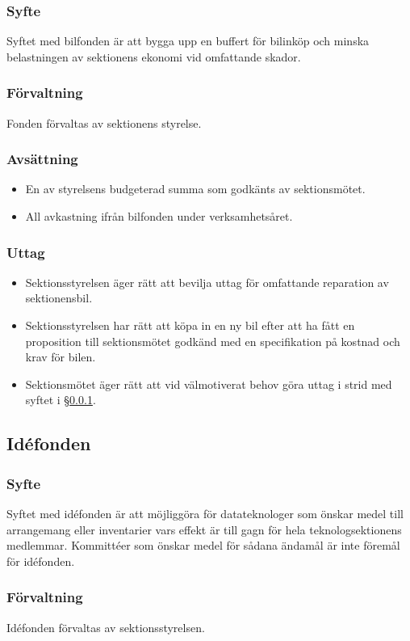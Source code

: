 \documentclass[a4paper, 10pt]{article}
\begin{document}
\subsubsection{Syfte}
\label{sec:bilfond_syfte}
Syftet med bilfonden är att bygga upp en buffert för bilinköp och minska belastningen av sektionens ekonomi vid omfattande skador.
\subsubsection{Förvaltning}
Fonden förvaltas av sektionens styrelse.
\subsubsection{Avsättning}
\begin{itemize}
\item En av styrelsens budgeterad summa som godkänts av sektionsmötet.
\item All avkastning ifrån bilfonden under verksamhetsåret.
\end{itemize}
\subsubsection{Uttag}
\begin{itemize}
    \item Sektionsstyrelsen äger rätt att bevilja uttag för omfattande reparation av sektionensbil.
    \item Sektionsstyrelsen har rätt att köpa in en ny bil efter att ha fått en proposition till sektionsmötet godkänd med en specifikation på kostnad och krav för bilen.
    \item Sektionsmötet äger rätt att vid välmotiverat behov göra uttag i strid med syftet i \S\ref{sec:bilfond_syfte}.
\end{itemize}

\subsection{Idéfonden}
\subsubsection{Syfte}
\label{sec:idefond_syfte}
Syftet med idéfonden är att möjliggöra för datateknologer som önskar medel till arrangemang eller inventarier vars effekt är till gagn för hela teknologsektionens medlemmar. Kommittéer som önskar medel för sådana ändamål är inte föremål för idéfonden.
\subsubsection{Förvaltning}
Idéfonden förvaltas av sektionsstyrelsen.
\end{document}
